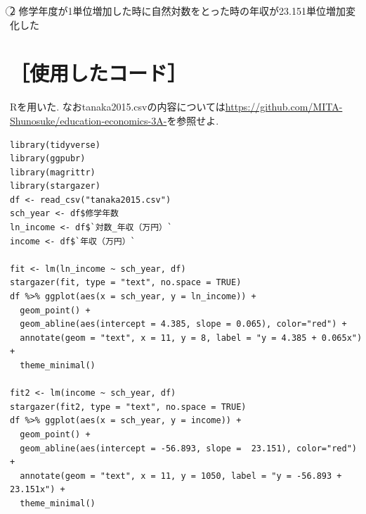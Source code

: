 \documentclass[10pt,leqno]{jarticle}%
\begin{document}
\begin{description}
\textcircled{\scriptsize 2} 
修学年度が1単位増加した時に自然対数をとった時の年収が23.151単位増加変化した

\end{description}

\section*{［使用したコード］}
Rを用いた. 
なおtanaka2015.csvの内容については\url{https://github.com/MITA-Shunosuke/education-economics-3A-}を参照せよ.
\begin{lstlisting}[caption=使用したプログラム]
library(tidyverse)
library(ggpubr)
library(magrittr)
library(stargazer)
df <- read_csv("tanaka2015.csv")
sch_year <- df$修学年数 
ln_income <- df$`対数_年収（万円）`
income <- df$`年収（万円）`

fit <- lm(ln_income ~ sch_year, df)
stargazer(fit, type = "text", no.space = TRUE)
df %>% ggplot(aes(x = sch_year, y = ln_income)) +
  geom_point() +
  geom_abline(aes(intercept = 4.385, slope = 0.065), color="red") + 
  annotate(geom = "text", x = 11, y = 8, label = "y = 4.385 + 0.065x") + 
  theme_minimal()

fit2 <- lm(income ~ sch_year, df)
stargazer(fit2, type = "text", no.space = TRUE)
df %>% ggplot(aes(x = sch_year, y = income)) +
  geom_point() +
  geom_abline(aes(intercept = -56.893, slope =  23.151), color="red") + 
  annotate(geom = "text", x = 11, y = 1050, label = "y = -56.893 + 23.151x") + 
  theme_minimal()

\end{lstlisting}
\end{document}
